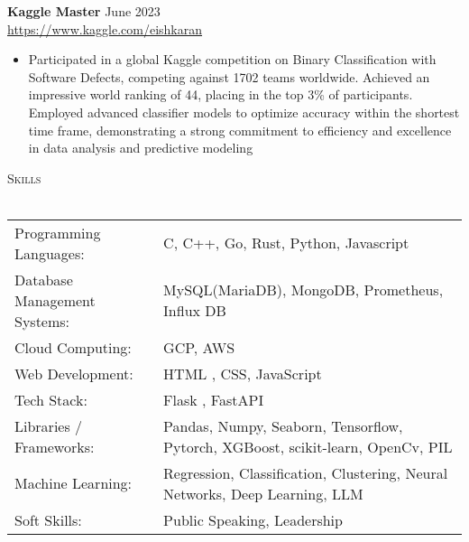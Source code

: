 \documentclass[a4paper]{article}
\newcommand{\lineunder} {
    \vspace*{-8pt} \\
    \hspace*{-18pt} \hrulefill \\
}
\newcommand{\header} [1] {
    {\hspace*{-18pt}\vspace*{6pt} \textsc{#1}}
    \vspace*{-6pt} \lineunder
}
\begin{document}
\vspace{-2.5mm}
{\textbf{Kaggle Master}} \hfill June 2023 \\
\vspace{-1mm}
\url{https://www.kaggle.com/eishkaran} \\
\vspace{-1.5mm}
\begin{itemize} 
    \vspace{-1mm}
    \item Participated in a global Kaggle competition on Binary Classification with Software Defects, competing against 1702 teams worldwide. Achieved an impressive world ranking of 44, placing in the top 3\% of participants. Employed advanced classifier models to optimize accuracy within the shortest time frame, demonstrating a strong commitment to efficiency and excellence in data analysis and predictive modeling
\vspace{-2.5mm}
\end{itemize}
\vspace{-2mm}
\header{Skills}
\vspace{0.5mm}
\begin{tabular}{ l l }
	Programming Languages: & C, C++, Go, Rust, Python, Javascript  \\
	Database Management Systems: & MySQL(MariaDB), MongoDB, Prometheus, Influx DB \\ 
    Cloud Computing: & GCP, AWS\\
	Web Development:       & HTML , CSS, JavaScript   \\
    Tech Stack:       & Flask , FastAPI   \\
	Libraries / Frameworks: & Pandas, Numpy, Seaborn, Tensorflow, Pytorch, XGBoost, scikit-learn, OpenCv, PIL       \\
	Machine Learning:             & Regression, Classification, Clustering, Neural Networks, Deep Learning, LLM\\
	Soft Skills:           &  Public Speaking, Leadership  \\
	
\end{tabular}


\end{document}
